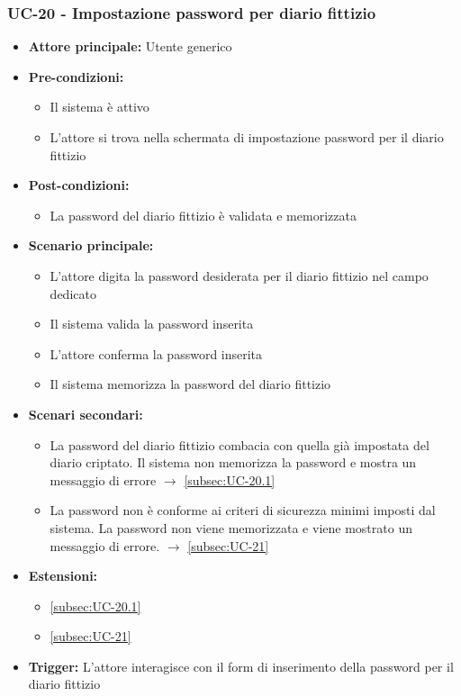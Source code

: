 \documentclass[a4paper,12pt]{article}
\begin{document}
\subsubsection{UC-20 - Impostazione password per diario fittizio} \label{subsec:UC-20}
\begin{itemize}
    \item \textbf{Attore principale:} Utente generico
    \item \textbf{Pre-condizioni:}
    \begin{itemize}
        \item Il sistema è attivo
        \item L'attore si trova nella schermata di impostazione password per il diario fittizio
    \end{itemize}
    \item \textbf{Post-condizioni:} 
    \begin{itemize}
        \item La password del diario fittizio è validata e memorizzata
    \end{itemize}
    \item \textbf{Scenario principale:} 
    \begin{itemize}
        \item L'attore digita la password desiderata per il diario fittizio nel campo dedicato
        \item Il sistema valida la password inserita
        \item L'attore conferma la password inserita
        \item Il sistema memorizza la password del diario fittizio
    \end{itemize}
    \item \textbf{Scenari secondari:} 
    \begin{itemize}
        \item La password del diario fittizio combacia con quella già impostata del diario criptato. Il sistema non memorizza la password e mostra un messaggio di errore $\rightarrow$ \ref{subsec:UC-20.1}
        \item La password non è conforme ai criteri di sicurezza minimi imposti dal sistema. La password non viene memorizzata e viene mostrato un messaggio di errore. $\rightarrow$ \ref{subsec:UC-21}
    \end{itemize}
    \item \textbf{Estensioni:}
    \begin{itemize}
        \item \ref{subsec:UC-20.1}
        \item \ref{subsec:UC-21}
    \end{itemize}
    \item \textbf{Trigger:} L'attore interagisce con il form di inserimento della password per il diario fittizio
\end{itemize}
\end{document}
